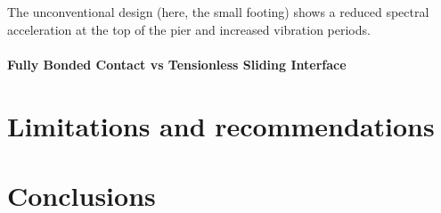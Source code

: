 The unconventional design (here, the small footing) shows a reduced spectral acceleration at the top of the pier and increased vibration periods.

\paragraph{Fully Bonded Contact vs Tensionless Sliding Interface}

\section{Limitations and recommendations}


\section{Conclusions}

